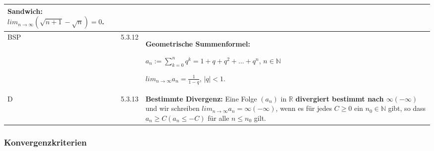 \begin{longtable}{p{0.75cm} p{1cm} p{16cm}}
                        Sandwich: $lim_{n \rightarrow \infty}(\sqrt{n + 1} - \sqrt{n}) = 0$. \\
        \midrule
        BSP & 5.3.12&   \textbf{Geometrische Summenformel:} \hfill \break
                        \centerline{$a_n := \sum^n_{k=0} q^k = 1 + q + q^2 + ... + q^n$, $n \in \mathbb{N}$}
                        $lim_{n \rightarrow \infty} a_n = \frac{1}{1-q}$, $|q| < 1$. \\
        \midrule
        D   & 5.3.13&   \textbf{Bestimmte Divergenz:} \hfill \break
                        Eine Folge $(a_n)$ in $\mathbb{R}$ \textbf{divergiert bestimmt nach $\infty (- \infty)$} und wir schreiben
                        $lim_{n \rightarrow \infty} a_n = \infty (-\infty)$, wenn es für jedes $C \geq 0$ ein $n_0 \in \mathbb{N}$ gibt, so dass
                        $a_n \geq C (a_n \leq -C)$ für alle $n \leq n_0$ gilt. \\
        \bottomrule
        
    \end{longtable}

\subsubsection{Konvergenzkriterien}

